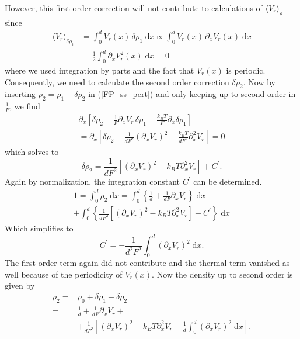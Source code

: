 \documentclass[aps,pre,twocolumn,showpacs,showkeys,a4paper]{revtex4}
\newcommand{\rmd}{{\mathrm d}}
\begin{document}
However, this first order correction will not contribute to calculations of $\langle V_r \rangle_\rho$ since
\begin{align*}
\langle V_r \rangle_{\delta\rho_1} 
&= \int_0^d V_r(x) \, \delta\rho_1 \; \rmd x
\propto \int_0^d V_r(x) \, \partial_x V_r(x) \; \rmd x \\
&= \frac{1}{2} \int_0^d \partial_x V_r^2(x) \; \rmd x 
= 0
\end{align*}
where we used integration by parts and the fact that $V_r(x)$ is periodic.
Consequently, we need to calculate the second order correction $\delta\rho_2$. 
Now by inserting $\rho_2 = \rho_1 + \delta\rho_2$ in (\ref{FP_ss_pert}) and only keeping up to second order in $\frac{1}{F}$, we find
\begin{multline*}
\partial_x \left[ \delta\rho_2 - \frac{1}{F} \partial_x V_r \, \delta\rho_1 - \frac{k_B T}{F} \partial_x \delta\rho_1 \right] \\
= \partial_x \left[ \delta\rho_2 - \frac{1}{ d F^2 } \left(\partial_x V_r\right)^2 - \frac{k_B T}{dF^2} \partial_x^2 V_r \right] 
= 0
\end{multline*}
which solves to
\begin{equation*}
\delta\rho_2 = \frac{1}{ d F^2} \left[ \left( \partial_x V_r \right)^2 - k_B T \partial_x^2 V_r \right] + C^\prime.
\end{equation*}
Again by normalization, the integration constant $C^\prime$ can be determined.
\begin{multline*}
1 = \int_0^d \rho_2 \; \rmd x 
= \int_0^d \left\{ \frac{1}{d} + \frac{1}{ d F } \partial_x V_r \right\} \; \rmd x \\
+ \int_0^d \left\{  \frac{1}{ d F^2 } \left[ \left( \partial_x V_r \right)^2 - k_B T \partial_x^2 V_r \right] + C^\prime\right\} \; \rmd x 
\end{multline*}
Which simplifies to
\begin{equation}
C^\prime = - \frac{1}{ d^2 F^2 } \int_0^d \left( \partial_x V_r \right)^2 \; \rmd x . 
\end{equation}
The first order term again did not contribute and the thermal term vanished as well because of the periodicity of $V_r(x)$. 
Now the density up to second order is given by
\begin{align*}
\rho_2 =& \rho_0 + \delta\rho_1 + \delta\rho_2 \\
=& \frac{1}{d} + \frac{1}{d F} \partial_x V_r +{} \\
&+ \frac{1}{d F^2} \left[ \left( \partial_x V_r \right)^2 - k_B T \partial_x^2V_r - \frac{1}{d} \int_0^d \left( \partial_x V_r \right)^2 \; \rmd x \right] .
\end{align*}
\end{document}
